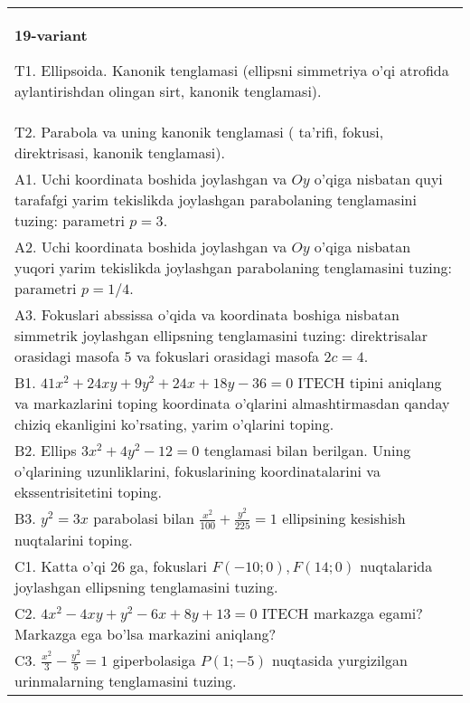 \documentclass{article}
\begin{document}
\begin{tabular}{m{17cm}}
\textbf{19-variant}
\newline

T1. Ellipsoida. Kanonik tenglamasi (ellipsni simmetriya o'qi atrofida aylantirishdan olingan sirt, kanonik tenglamasi).\\

T2. Parabola va uning kanonik tenglamasi ( ta'rifi, fokusi, direktrisasi, kanonik tenglamasi).\\

A1. Uchi koordinata boshida joylashgan va $Oy$ o'qiga nisbatan quyi tarafafgi yarim tekislikda joylashgan parabolaning tenglamasini tuzing: parametri $p=3$.\\

A2. Uchi koordinata boshida joylashgan va $Oy$ o'qiga nisbatan yuqori yarim tekislikda joylashgan parabolaning tenglamasini tuzing: parametri $p=1/4$.\\

A3. Fokuslari abssissa o'qida va koordinata boshiga nisbatan simmetrik joylashgan ellipsning tenglamasini tuzing: direktrisalar orasidagi masofa $5$ va fokuslari orasidagi masofa $2c=4$.\\

B1. $41x^{2} + 24xy + 9y^{2} + 24x + 18y - 36 = 0$ ITECH tipini aniqlang va markazlarini toping koordinata o'qlarini almashtirmasdan qanday chiziq ekanligini ko'rsating, yarim o'qlarini toping.  \\

B2. Ellips $3x^{2} + 4y^{2} - 12 = 0$ tenglamasi bilan berilgan. Uning o'qlarining uzunliklarini, fokuslarining koordinatalarini va ekssentrisitetini toping.  \\

B3. $y^{2} = 3x$ parabolasi bilan $\frac{x^{2}}{100} + \frac{y^{2}}{225} = 1$ ellipsining kesishish nuqtalarini toping.  \\

C1. Katta o'qi 26 ga, fokuslari $F( - 10;0), F(14;0)$ nuqtalarida joylashgan ellipsning tenglamasini tuzing.  \\

C2. $4x^{2} - 4xy + y^{2} - 6x + 8y + 13 = 0$ ITECH markazga egami? Markazga ega bo'lsa markazini aniqlang?  \\

C3. $\frac{x^{2}}{3} - \frac{y^{2}}{5} = 1$ giperbolasiga $P(1; - 5)$ nuqtasida yurgizilgan urinmalarning tenglamasini tuzing.\\

\end{tabular}
\vspace{1cm}
\end{document}
